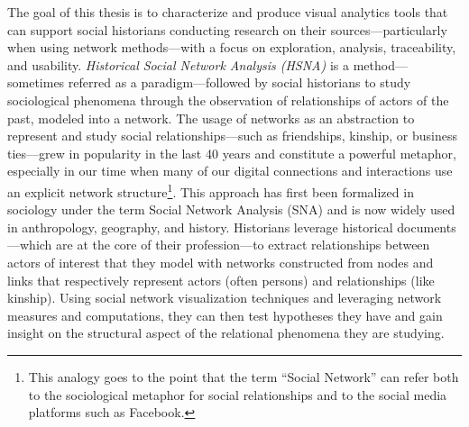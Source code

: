 The goal of this thesis is to characterize and produce visual analytics tools that can support social historians conducting research on their sources---particularly when using network methods---with a focus on exploration, analysis, traceability, and usability.
\textit{Historical Social Network Analysis (HSNA)} is a method---sometimes referred as a paradigm\cite{whiteNetworkAnalysisEthnographic2005}---followed by social historians to study sociological phenomena through the observation of relationships of actors of the past, modeled into a network.
The usage of networks as an abstraction to represent and study social relationships---such as friendships, kinship, or business ties---grew in popularity in the last 40 years \cite{freemanDevelopmentSocialNetwork2004, tabassumSocialNetworkAnalysis2018} and constitute a powerful metaphor, especially in our time when many of our digital connections and interactions use an explicit network structure\footnote{This analogy goes to the point that the term ``Social Network'' can refer both to the sociological metaphor for social relationships and to the social media platforms such as Facebook.}.
This approach has first been formalized in sociology under the term Social Network Analysis (SNA)\cite{freemanDevelopmentSocialNetwork2004} and is now widely used in anthropology\cite{millsSocialNetworkAnalysis2017}, geography\cite{beauguitteThéorieGraphesAnalyse2022}, and history\cite{kerschbaumerPowerNetworksProspects2015}.
Historians leverage historical documents---which are at the core of their profession\cite{langloisIntroductionAuxEtudes2014}---to extract relationships between actors of interest that they model with networks constructed from nodes and links that respectively represent actors (often persons) and relationships (like kinship).
Using social network visualization techniques and leveraging network measures and computations, they can then test hypotheses they have and gain insight on the structural aspect of the relational phenomena they are studying\cite{wetherellHistoricalSocialNetwork1998, kerschbaumerPowerNetworksProspects2015}.
